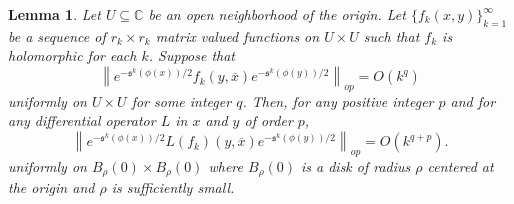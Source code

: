 \documentclass{amsart}
\newtheorem{lem}[thm]{Lemma}
\theoremstyle{definition}
\theoremstyle{remark}
\numberwithin{equation}{section}
\begin{document}
\begin{lem} \label{lem: Cauchy}
Let $U \subseteq \mathbb{C}$ be an open neighborhood of the origin. Let $\{f_k(x,y)\}_{k=1}^\infty$ be a sequence of $r_k \times r_k$ matrix valued functions on $U \times U$ such that $f_k$ is holomorphic for each $k$. Suppose that 
$$
\left \| e^{-\mathfrak{s}^k(\phi(x))/2} f_k(y,\overline{x}) e^{-\mathfrak{s}^k(\phi(y))/2} \right \|_{op} = O(k^q)
$$
uniformly on $U \times U$ for some integer $q$. Then, for any positive integer $p$ and for any differential operator $L$ in $x$ and $y$ of order $p$,
$$
\left \| e^{-\mathfrak{s}^k(\phi(x))/2} L (f_k)(y,\overline{x}) e^{-\mathfrak{s}^k(\phi(y))/2} \right \|_{op} = O(k^{q+p}).
$$
uniformly on $B_\rho(0) \times B_\rho(0)$ where $B_\rho(0)$ is a disk of radius $\rho$ centered at the origin and $\rho$ is sufficiently small. 
\end{lem}
\end{document}
